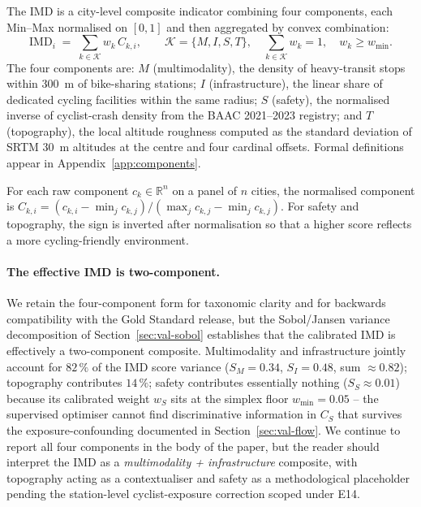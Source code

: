 \documentclass[11pt,a4paper]{article}
\newcommand{\IMD}{\mathrm{IMD}}
\begin{document}
The IMD is a city-level composite indicator combining four
components, each Min--Max normalised on $[0, 1]$ and then
aggregated by convex combination:
\begin{equation}
    \IMD_i \;=\;
    \sum_{k\in\mathcal{K}} w_k\, C_{k,i},
    \qquad \mathcal{K} = \{M, I, S, T\},
    \quad \sum_{k\in\mathcal{K}} w_k = 1,
    \quad w_k \geq w_{\min}.
    \label{eq:imd}
\end{equation}
The four components are: $M$ (multimodality), the density of
heavy-transit stops within 300~m of bike-sharing stations; $I$
(infrastructure), the linear share of dedicated cycling facilities
within the same radius; $S$ (safety), the normalised inverse of
cyclist-crash density from the BAAC 2021--2023 registry; and $T$
(topography), the local altitude roughness computed as the
standard deviation of SRTM 30~m altitudes at the centre and four
cardinal offsets. Formal definitions appear in
Appendix~\ref{app:components}.

For each raw component $c_k \in \mathbb{R}^{n}$ on a panel of $n$
cities, the normalised component is
$C_{k,i} = (c_{k,i} - \min_j c_{k,j}) / (\max_j c_{k,j} - \min_j c_{k,j})$.
For safety and topography, the sign is inverted after normalisation
so that a higher score reflects a more cycling-friendly
environment.

\paragraph{The effective IMD is two-component.}
We retain the four-component form for taxonomic clarity and for
backwards compatibility with the
\citet{Fosse2026gold} Gold Standard release, but the Sobol/Jansen
variance decomposition of Section~\ref{sec:val-sobol} establishes
that the calibrated IMD is effectively a two-component composite.
Multimodality and infrastructure jointly account for $82\,\%$ of
the IMD score variance ($S_M = 0.34$, $S_I = 0.48$, sum
$\approx 0.82$); topography contributes $14\,\%$; safety
contributes essentially nothing ($S_S \approx 0.01$) because
its calibrated weight $w_S$ sits at the simplex floor
$w_{\min} = 0.05$ -- the supervised optimiser cannot find
discriminative information in $C_S$ that survives the
exposure-confounding documented in Section~\ref{sec:val-flow}.
We continue to report all four components in the body of the
paper, but the reader should interpret the IMD as a
\emph{multimodality + infrastructure} composite, with topography
acting as a contextualiser and safety as a methodological
placeholder pending the station-level cyclist-exposure
correction scoped under E14.
\end{document}
